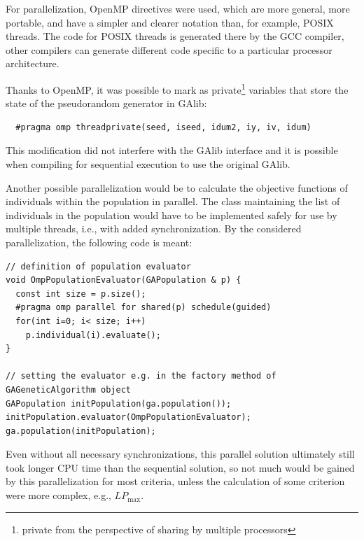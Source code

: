 For parallelization, OpenMP directives were used, which are more general,
more portable, and have a simpler and clearer notation
than, for example, POSIX threads. The code for POSIX threads is generated there by the GCC compiler, other
compilers can generate different code specific to a particular processor architecture.

Thanks to OpenMP, it was possible to mark as
private\footnote{private from the perspective of sharing by multiple processors}
variables that store
the state of the pseudorandom generator in GAlib:
\begin{verbatim}
  #pragma omp threadprivate(seed, iseed, idum2, iy, iv, idum)
\end{verbatim}
This modification did not interfere with
the GAlib interface and it is possible when compiling for sequential execution
to use the original GAlib.

Another possible parallelization would be to calculate the objective
functions of individuals within the population in parallel. The class  maintaining the list of individuals
in the population would have to be implemented safely for
use by multiple threads, i.e., with added synchronization.
\pagebreak
By the considered parallelization, the following code is meant:
\begin{verbatim}
// definition of population evaluator
void OmpPopulationEvaluator(GAPopulation & p) {
  const int size = p.size();
  #pragma omp parallel for shared(p) schedule(guided)
  for(int i=0; i< size; i++)
    p.individual(i).evaluate();
}

// setting the evaluator e.g. in the factory method of GAGeneticAlgorithm object
GAPopulation initPopulation(ga.population());
initPopulation.evaluator(OmpPopulationEvaluator);
ga.population(initPopulation);
\end{verbatim}

Even without all necessary synchronizations, this parallel solution ultimately still took longer CPU time
than the sequential solution, so not much would be gained by this parallelization for most criteria,
unless the calculation of some criterion were more complex, e.g., $LP_{\max}$.
